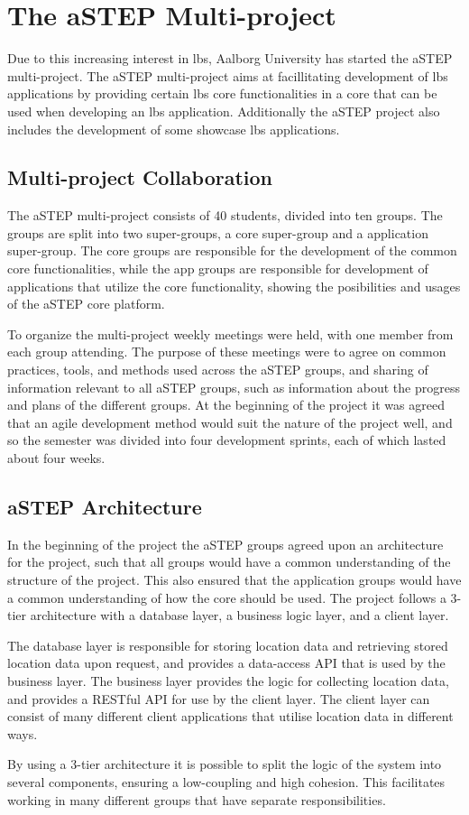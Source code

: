 \section{The aSTEP Multi-project} \label{sec:astep}
Due to this increasing interest in \gls{lbs}, Aalborg University has started the aSTEP multi-project. The aSTEP multi-project aims at facillitating development of \gls{lbs} applications by providing certain \gls{lbs} core functionalities in a core that can be used when developing an \gls{lbs} application. Additionally the aSTEP project also includes the development of some showcase \gls{lbs} applications.

\subsection{Multi-project Collaboration}
The aSTEP multi-project consists of 40 students, divided into ten groups. The groups are split into two super-groups, a core super-group and a application super-group. The core groups are responsible for the development of the common core functionalities, while the app groups are responsible for development of applications that utilize the core functionality, showing the posibilities and usages of the aSTEP core platform. 

To organize the multi-project weekly meetings were held, with one member from each group attending. The purpose of these meetings were to agree on common practices, tools, and methods used across the aSTEP groups, and sharing of information relevant to all aSTEP groups, such as information about the progress and plans of the different groups. At the beginning of the project it was agreed that an agile development method would suit the nature of the project well, and so the semester was divided into four development sprints, each of which lasted about four weeks.

\subsection{aSTEP Architecture}
In the beginning of the project the aSTEP groups agreed upon an architecture for the project, such that all groups would have a common understanding of the structure of the project. This also ensured that the application groups would have a common understanding of how the core should be used. The project follows a 3-tier architecture with a database layer, a business logic layer, and a client layer. 

The database layer is responsible for storing location data and retrieving stored location data upon request, and provides a data-access API that is used by the business layer. The business layer provides the logic for collecting location data, and provides a RESTful API for use by the client layer. The client layer can consist of many different client applications that utilise location data in different ways.

By using a 3-tier architecture it is possible to split the logic of the system into several components, ensuring a low-coupling and high cohesion. This facilitates working in many different groups that have separate responsibilities.